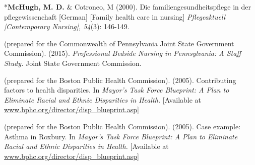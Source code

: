 \documentclass[10pt,]{article}
\begin{document}
{{{{{{{{{{{{{{\begin{hangparas}{.25in}{1}
\end{hangparas}

\vspace{4mm}

\begin{hangparas}{.25in}{1}

*{\textbf {McHugh, M. D.}} \& Cotroneo, M (2000). Die familiengesundheitspflege in der pflegewissenchaft  [German] [Family health care in nursing] {\textit {Pflegeaktuell [Contemporary Nursing], 54}}(3): 146-149.

\end{hangparas}

\vspace{4mm}


\begin{hangparas}{.25in}{1}

 (prepared for the Commonwealth of Pennsylvania Joint State Government Commission). (2015). {\textit {Professional Bedside Nursing in Pennsylvania: A Staff Study.}} Joint State Government Commission.

\end{hangparas}

\vspace{4mm}

\begin{hangparas}{.25in}{1}

 (prepared for the Boston Public Health Commission). (2005). Contributing factors to health disparities. In {\textit {Mayor’s Task Force Blueprint: A Plan to Eliminate Racial and Ethnic Disparities in Health.}} [Available at \href{http://www.bphc.org/director/disp_blueprint.asp}{\ttfamily www.bphc.org/director/disp\_blueprint.asp}]

\end{hangparas}

\vspace{4mm}

\begin{hangparas}{.25in}{1}

 (prepared for the Boston Public Health Commission). (2005). Case example: Asthma in Roxbury. In {\textit {Mayor’s Task Force Blueprint: A Plan to Eliminate Racial and Ethnic Disparities in Health.}} [Available at \href{http://www.bphc.org/director/disp_blueprint.asp}{\ttfamily www.bphc.org/director/disp\_blueprint.asp}]


\end{hangparas}}}}}}}}}}}}}}}
\end{document}
